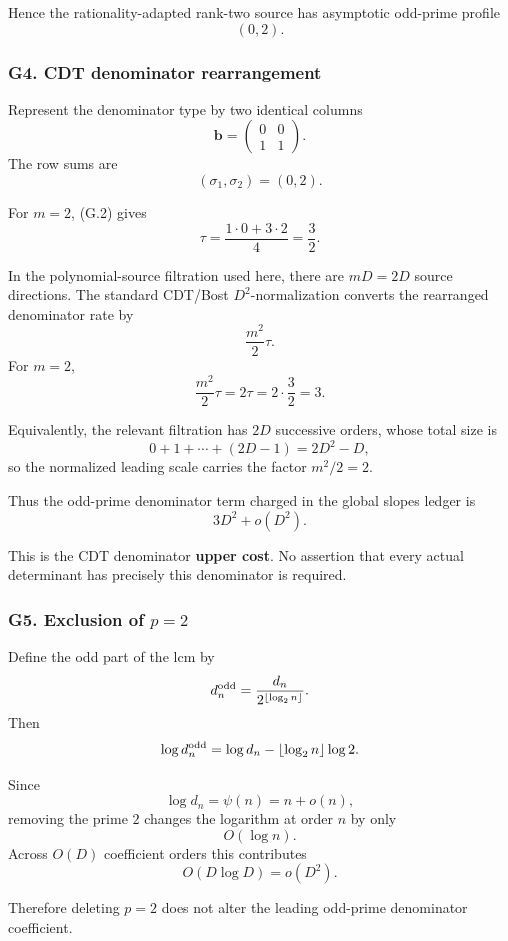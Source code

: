 \documentclass[
  10pt,
  letterpaper,
]{article}
\theoremstyle{definition}
\theoremstyle{remark}
\begin{document}
Hence the rationality-adapted rank-two source has asymptotic odd-prime
profile \[
\boxed{(0,2).}
\]

\subsubsection{G4. CDT denominator
rearrangement}\label{g4.-cdt-denominator-rearrangement}

Represent the denominator type by two identical columns \[
\mathbf b
=
\begin{pmatrix}
0&0\\
1&1
\end{pmatrix}.
\] The row sums are \[
(\sigma_1,\sigma_2)=(0,2).
\]

For \(m=2\), (G.2) gives \[
\tau
=
\frac{1\cdot0+3\cdot2}{4}
=
\boxed{\frac32}.
\]

In the polynomial-source filtration used here, there are \(mD=2D\)
source directions. The standard CDT/Bost \(D^2\)-normalization converts
the rearranged denominator rate by \[
\frac{m^2}{2}\tau.
\] For \(m=2\), \[
\frac{m^2}{2}\tau
=
2\tau
=
2\cdot\frac32
=
\boxed3.
\]

Equivalently, the relevant filtration has \(2D\) successive orders,
whose total size is \[
0+1+\cdots+(2D-1)
=
2D^2-D,
\] so the normalized leading scale carries the factor \(m^2/2=2\).

Thus the odd-prime denominator term charged in the global slopes ledger
is \[
\boxed{
3D^2+o(D^2).
}
\]

This is the CDT denominator \textbf{upper cost}. No assertion that every
actual determinant has precisely this denominator is required.

\subsubsection{\texorpdfstring{G5. Exclusion of
\(p=2\)}{G5. Exclusion of p=2}}\label{g5.-exclusion-of-p2}

Define the odd part of the lcm by \[
d_n^{\rm odd}
=
\frac{d_n}{2^{\lfloor\log_2n\rfloor}}.
\] Then \[
\log d_n^{\rm odd}
=
\log d_n
-
\lfloor\log_2n\rfloor\log2.
\]

Since \[
\log d_n=\psi(n)=n+o(n),
\] removing the prime \(2\) changes the logarithm at order \(n\) by only
\[
O(\log n).
\] Across \(O(D)\) coefficient orders this contributes \[
O(D\log D)=o(D^2).
\]

Therefore deleting \(p=2\) does not alter the leading odd-prime
denominator coefficient.
\end{document}
